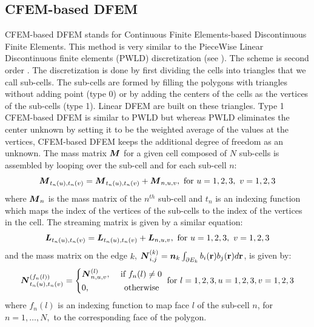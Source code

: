 \subsection{CFEM-based DFEM}
CFEM-based DFEM stands for Continuous Finite Elements-based Discontinuous
Finite Elements. This method is very similar to the PieceWise Linear
Discontinuous finite elements (PWLD) discretization (see ). 
The scheme is second order \cite{Warsa2008}. The discretization is done by
first dividing the cells into triangles that we call sub-cells. The sub-cells
are formed by filling the polygons with triangles without adding point (type
0) or by adding the centers of the cells as the vertices of the sub-cells
(type 1). Linear DFEM are built on these triangles. Type 1 CFEM-based DFEM is
similar to PWLD but whereas PWLD eliminates the center unknown by setting it
to be the weighted average of the values at the vertices, CFEM-based DFEM keeps 
the additional degree of freedom as an unknown. The mass matrix 
$\boldsymbol{M}$ for a given cell composed of $N$ sub-cells is assembled by looping
over the sub-cell and for each sub-cell $n$:
\begin{equation}
  \boldsymbol{M}_{t_n(u),t_n(v)} = \boldsymbol{M}_{t_n(u),t_n(v)} + \boldsymbol{M}_{n,u,v}, 
  \textrm{ for }u=1,2,3,\ v=1,2,3
  \label{mass_cfem}
\end{equation}
where $\boldsymbol{M}_n$ is the mass matrix of the $n^{th}$ sub-cell and $t_n$ is an 
indexing function which maps the index of the vertices of the sub-cells to the 
index of the vertices in the cell. The streaming matrix is given by a similar 
equation:
\begin{equation}
  \boldsymbol{L}_{t_n(u),t_n(v)} = \boldsymbol{L}_{t_n(u),t_n(v)} + \boldsymbol{L}_{n,u,v}, 
  \textrm{ for }u=1,2,3,\ v=1,2,3
  \label{stream_cfem}
\end{equation}
and the mass matrix on the edge $k$, $\boldsymbol{N}_{i,j}^{(k)} = \boldsymbol{n}_k
\int_{\partial E_k} b_i(\mathbf{r}) b_j(\mathbf{r}) d\mathbf{r}$, is given by:
\begin{equation}
  \boldsymbol{N}_{t_n(u),t_n(v)}^{(f_n(l))} = \left\{
    \begin{aligned}
      & \boldsymbol{N}_{n,u,v}^{(l)}, & \textrm{ if }f_n(l)\neq 0\\
      & 0, & \textrm{ otherwise }
    \end{aligned}
  \right.
  \textrm{ for } l=1,2,3,u=1,2,3,v=1,2,3
\end{equation}
where $f_n(l)$ is an indexing function to map face $l$ of the sub-cell $n$,
for $n=1,\hdots,N,$ to the corresponding face of the polygon.

